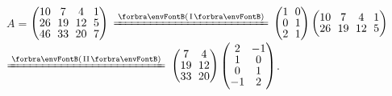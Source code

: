 \AExa $A={}${\small$\begin{pmatrix} 10 &\hspace{-4pt} 7 &\hspace{-4pt} 4 &\hspace{-4pt} 1 \\[-2pt] 26 &\hspace{-4pt} 19 &\hspace{-4pt} 12 &\hspace{-4pt} 5\\[-2pt] 46 &\hspace{-4pt} 33 &\hspace{-4pt} 20 &\hspace{-4pt} 7\end{pmatrix}$
	{$\xlongequal{\SmallPar{\text{I}}}$}
	$\begin{pmatrix} 1 &\hspace{-4pt} 0\\[-2pt] 0 &\hspace{-4pt} 1\\[-2pt] 2 &\hspace{-4pt} 1\end{pmatrix}\begin{pmatrix} 10 &\hspace{-4pt} 7 &\hspace{-4pt} 4 &\hspace{-4pt} 1\\[-2pt] 26 &\hspace{-4pt} 19 &\hspace{-4pt} 12 &\hspace{-4pt} 5\end{pmatrix}$
	{$\xlongequal{\SmallPar{\text{II}}}$}
	$\begin{pmatrix} 7 &\hspace{-4pt} 4\\[-2pt] 19 &\hspace{-4pt} 12\\[-2pt] 33 &\hspace{-4pt} 20\end{pmatrix}\begin{pmatrix} 2 &\hspace{-4pt} -1\\[-2pt] 1 &\hspace{-4pt} 0\\[-2pt] 0 &\hspace{-4pt} 1\\[-2pt] -1 &\hspace{-4pt} 2\end{pmatrix}$}.\par\quad
